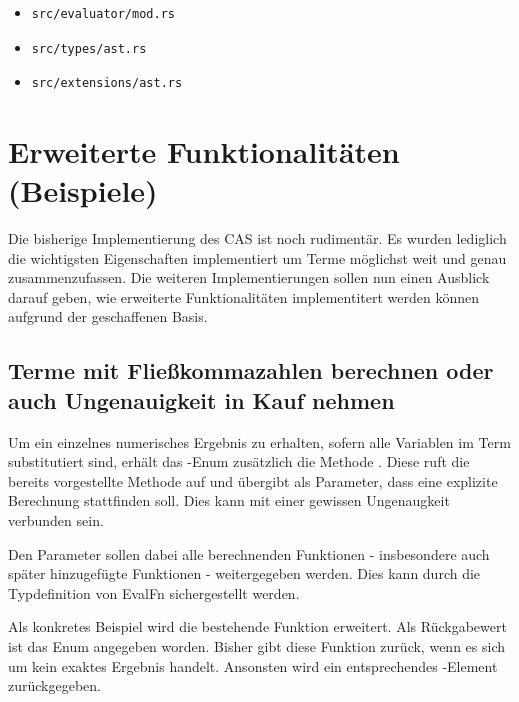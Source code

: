 \documentclass[11pt,a4paper, ngerman]{article}
\begin{document}
\begin{itemize}
    \item \begin{verbatim}src/evaluator/mod.rs\end{verbatim}
    \item \begin{verbatim}src/types/ast.rs\end{verbatim}
    \item \begin{verbatim}src/extensions/ast.rs\end{verbatim}
\end{itemize}

\newpage

\section{Erweiterte Funktionalitäten (Beispiele)}
Die bisherige Implementierung des CAS ist noch rudimentär. Es wurden lediglich die wichtigsten Eigenschaften implementiert um Terme möglichst weit und genau zusammenzufassen.
Die weiteren Implementierungen sollen nun einen Ausblick darauf geben, wie erweiterte Funktionalitäten implementitert werden können aufgrund der geschaffenen Basis. 

\label{sec:ungenauigkeitenKapitel}
\subsection{Terme mit Fließkommazahlen berechnen oder auch Ungenauigkeit in Kauf nehmen} Um ein einzelnes numerisches Ergebnis zu erhalten, sofern alle Variablen im Term substitutiert sind, erhält das -Enum zusätzlich die Methode . Diese ruft die bereits vorgestellte Methode  auf und übergibt als Parameter, dass eine explizite Berechnung stattfinden soll. Dies kann mit einer gewissen Ungenaugkeit verbunden sein.

Den Parameter  sollen dabei alle berechnenden Funktionen - insbesondere auch später hinzugefügte Funktionen - weitergegeben werden. Dies kann durch die Typdefinition von EvalFn sichergestellt werden.

Als konkretes Beispiel wird die bestehende Funktion  erweitert. Als Rückgabewert ist das Enum  angegeben worden. Bisher gibt diese Funktion  zurück, wenn es sich um kein exaktes Ergebnis handelt. Ansonsten wird ein entsprechendes -Element zurückgegeben.
\end{document}
